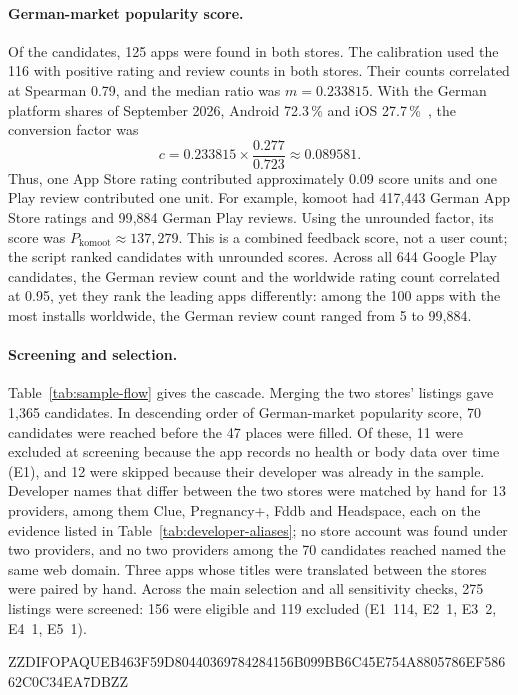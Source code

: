 \documentclass[twoside,its]{bossthesis}
\begin{document}
\paragraph{German-market popularity score.} Of the candidates, 125 apps were
found in both stores. The calibration used the 116 with positive rating and
review counts in both stores. Their counts correlated at Spearman 0.79, and
the median ratio was $m = 0.233815$. With the German platform shares of
September 2026, Android 72.3\,\% and iOS
27.7\,\%~\parencite{statcounter2026os}, the conversion factor was
\[
  c = 0.233815\times\frac{0.277}{0.723}\approx 0.089581.
\]
Thus, one App Store rating contributed approximately 0.09 score units and one
Play review contributed one unit. For example, komoot had 417{,}443 German App
Store ratings and 99{,}884 German Play reviews. Using the unrounded factor,
its score was $P_{\mathrm{komoot}}\approx137{,}279$. This is a combined feedback
score, not a user count; the script ranked candidates with unrounded scores.
Across all 644 Google Play candidates, the German review count and the
worldwide rating count correlated at 0.95, yet they rank the leading apps
differently: among the 100 apps with the most installs worldwide, the German
review count ranged from 5 to 99{,}884.

\paragraph{Screening and selection.} Table~\ref{tab:sample-flow} gives the
cascade. Merging the two stores' listings gave 1{,}365 candidates. In descending
order of German-market popularity score, 70 candidates were reached before
the 47 places were filled.
Of these, 11 were excluded at screening because the app records no health or
body data over time (E1), and 12 were skipped because their developer was
already in the sample. Developer names that differ between the two stores were
matched by hand for 13 providers, among them Clue, Pregnancy+, Fddb and
Headspace, each on the evidence listed in Table~\ref{tab:developer-aliases};
no store account was found under two providers, and no two providers among the
70 candidates reached named the same web domain. Three apps whose titles were
translated between the stores were paired by hand. Across the main selection and all sensitivity checks, 275
listings were screened: 156 were eligible and 119 excluded (E1~114, E2~1,
E3~2, E4~1, E5~1).



ZZDIFOPAQUEB463F59D80440369784284156B099BB6C45E754A8805786EF58662C0C34EA7DBZZ
\end{document}
